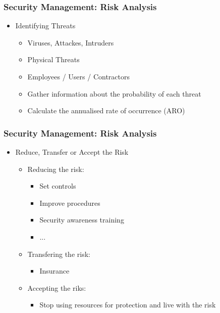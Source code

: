 \documentclass{beamer}
\begin{document}


\begin{frame}
\frametitle{Security Management: Risk Analysis}
\begin{itemize}

\item Identifying Threats
  \begin{itemize}
  \item Viruses, Attackes, Intruders
  \item Physical Threats
  \item Employees / Users / Contractors
  \item Gather information about the probability of each threat
  \item Calculate the annualised rate of occurrence (ARO)
  \end{itemize}
\end{itemize}
\end{frame}



\begin{frame}
\frametitle{Security Management: Risk Analysis}
\begin{itemize}

\item Reduce, Transfer or Accept the Risk
  \begin{itemize}
  \item Reducing the risk:
     \begin{itemize}
     \item Set controls
     \item Improve procedures
     \item Security awareness training
     \item ...
     \end{itemize}
  \item Transfering the risk:
     \begin{itemize}
     \item Insurance
     \end{itemize}
  \item Accepting the riks:
     \begin{itemize}
     \item Stop using resources for protection and live with the risk
     \end{itemize}
  \end{itemize}
\end{itemize}
\end{frame}
\end{document}
